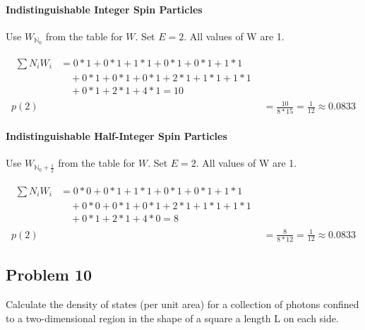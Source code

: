 \documentclass[12pt]{article}
\begin{document}
            \paragraph{Indistinguishable Integer Spin Particles}
                Use $W_{\mathbb{N}_0}$ from the table for $W$. 
                Set $E = 2$.
                All values of W are 1.
                
                \begin{align}
                    \begin{split}
                        \sum N_i W_i    &= 0*1 + 0*1 + 1*1 + 0*1 + 0*1 + 1*1 \\
                                        &\quad + 0*1 + 0*1 + 0*1 + 2*1 + 1*1 + 1*1\\ 
                                        &\quad + 0*1 + 2*1 + 4*1 = 10
                    \end{split}\\
                    p(2)    &=  \frac{10}{8*15}
                            =   \boxed{\frac{1}{12} \approx 0.0833}
                \end{align}

            \paragraph{Indistinguishable Half-Integer Spin Particles}
                Use $W_{\mathbb{N}_0 + \frac{1}{2}}$ from the table for $W$. 
                Set $E = 2$.
                All values of W are 1.
                
                \begin{align}
                    \begin{split}
                        \sum N_i W_i    &= 0*0 + 0*1 + 1*1 + 0*1 + 0*1 + 1*1 \\
                                        &\quad + 0*0 + 0*1 + 0*1 + 2*1 + 1*1 + 1*1\\ 
                                        &\quad + 0*1 + 2*1 + 4*0 = 8
                    \end{split}\\
                    p(2)    &=  \frac{8}{8*12}
                            =   \boxed{\frac{1}{12} \approx 0.0833}
                \end{align}
        
    \pagebreak
    \subsection{Problem 10}
        Calculate the density of states (per unit area) for a collection of photons conﬁned to a two-dimensional region in the shape of a square a length L on each side.
\end{document}
